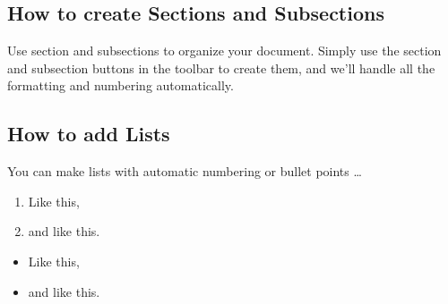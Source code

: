 \documentclass[a4paper]{article}
\begin{document}
\subsection{How to create Sections and Subsections}

Use section and subsections to organize your document. Simply use the section and subsection buttons in the toolbar to create them, and we'll handle all the formatting and numbering automatically.

\subsection{How to add Lists}

You can make lists with automatic numbering  or bullet points \dots

\begin{enumerate}
\item Like this,
\item and like this.
\end{enumerate}

\begin{itemize}
\item Like this,
\item and like this.
\end{itemize}






%
%
\end{document}
